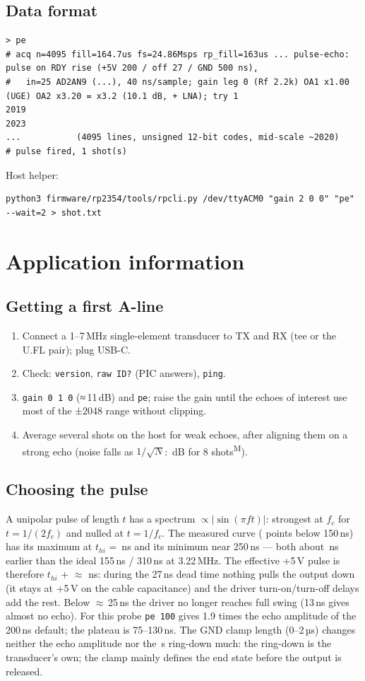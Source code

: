 \documentclass[10pt,a4paper]{article}
\newcommand{\us}{\,\textmu s}
\newcommand{\cmd}[1]{\texttt{#1}}
\newcommand{\meas}{\textsuperscript{M}}
\begin{document}
\subsection{Data format}
\begin{lstlisting}
> pe
# acq n=4095 fill=164.7us fs=24.86Msps rp_fill=163us ... pulse-echo: pulse on RDY rise (+5V 200 / off 27 / GND 500 ns),
#   in=25 AD2AN9 (...), 40 ns/sample; gain leg 0 (Rf 2.2k) OA1 x1.00 (UGE) OA2 x3.20 = x3.2 (10.1 dB, + LNA); try 1
2019
2023
...           (4095 lines, unsigned 12-bit codes, mid-scale ~2020)
# pulse fired, 1 shot(s)
\end{lstlisting}
Host helper:
\begin{lstlisting}
python3 firmware/rp2354/tools/rpcli.py /dev/ttyACM0 "gain 2 0 0" "pe" --wait=2 > shot.txt
\end{lstlisting}

\section{Application information}
\subsection{Getting a first A-line}
\begin{enumerate}
  \item Connect a 1–7\,MHz single-element transducer to TX and RX (tee or the U.FL pair); plug USB-C.
  \item Check: \cmd{version}, \cmd{raw ID?} (PIC answers), \cmd{ping}.
  \item \cmd{gain 0 1 0} (≈\,11\,dB) and \cmd{pe}; raise the gain until the echoes of interest use most of the ±2048 range without clipping.
  \item Average several shots on the host for weak echoes, after aligning them on a strong echo (noise falls as $1/\sqrt{N}$: \vavggain\,dB for 8 shots\meas).
\end{enumerate}
\subsection{Choosing the pulse}
A unipolar pulse of length $t$ has a spectrum $\propto |\sin(\pi f t)|$: strongest at $f_c$ for $t = 1/(2f_c)$ and nulled at
$t = 1/f_c$. The measured curve (\vhinpts{} points below 150\,ns) has its maximum at $t_{hi}$ = \vhibest\,ns and its minimum near
250\,ns — both about \vdeltaeff\,ns earlier than the ideal 155\,ns / 310\,ns at 3.22\,MHz. The effective +5\,V pulse is therefore
$t_{hi}$ + $\approx$\,\vdeltaeff\,ns: during the 27\,ns dead time nothing pulls the output down (it stays at +5\,V on the cable
capacitance) and the driver turn-on/turn-off delays add the rest. Below $\approx$\,25\,ns the driver no longer reaches full
swing (13\,ns gives almost no echo). For this probe \cmd{pe 100} gives 1.9 times the echo amplitude of the 200\,ns default;
the plateau is 75–130\,ns. The GND clamp length (0–2\,µs) changes neither the echo amplitude nor the \vdeadzone\us{} ring-down much:
the ring-down is the transducer's own; the clamp mainly defines the end state before the output is released.
\end{document}
